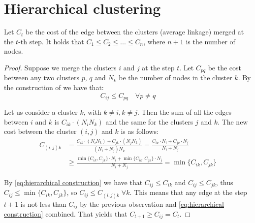 \section{Hierarchical clustering}
\begin{theorem}
    Let $C_t$ be the cost of the edge between the clusters (average linkage) merged at the $t$-th step. It holds that $C_1 \leq C_2 \leq ... \leq C_n$, where $n + 1$ is the number of nodes.
\end{theorem}
\begin{proof}
    Suppose we merge the clusters $i$ and $j$ at the step $t$. Let $C_{pq}$ be the cost between any two clusters $p$, $q$ and $N_{k}$ be the number of nodes in the cluster $k$. By the construction of  we have that:
    \begin{equation} \label{eq:hierarchical construction}
        C_{ij} \leq C_{pq} \quad \forall p \neq q
    \end{equation}
    
    Let us consider a cluster $k$, with $k \neq i, k \neq j$. Then the sum of all the edges between $i$ and $k$ is $C_{ik} \cdot (N_i N_k)$ and the same for the clusters $j$ and $k$. The new cost between the cluster $(i,j)$ and $k$ is as follows:
    \begin{align*}
        C_{(i,j)k}
         & = \frac{C_{ik} \cdot (N_i N_k) + C_{jk} \cdot (N_j N_k)}{(N_i + N_j) N_k}
        = \frac{C_{ik} \cdot N_i + C_{jk} \cdot N_j}{N_i + N_j}
        \\ &\geq \frac{\min\{C_{ik}, C_{jk}\} \cdot N_i + \min\{C_{ik}, C_{jk}\} \cdot N_j}{N_i + N_j}
        = \min\{C_{ik}, C_{jk}\}
    \end{align*}

    By \eqref{eq:hierarchical construction} we have that $C_{ij} \leq C_{ik}$ and $C_{ij} \leq C_{jk}$, thus $C_{ij} \leq \min\{C_{ik}, C_{jk}\}$, so $C_{ij} \leq C_{(i,j)k} \; \forall k$. This means that any edge at the step $t+1$ is not less than $C_{ij}$ by the previous observation and \eqref{eq:hierarchical construction} combined. That yields that $C_{t+1} \geq C_{ij} = C_{t}$.
\end{proof}